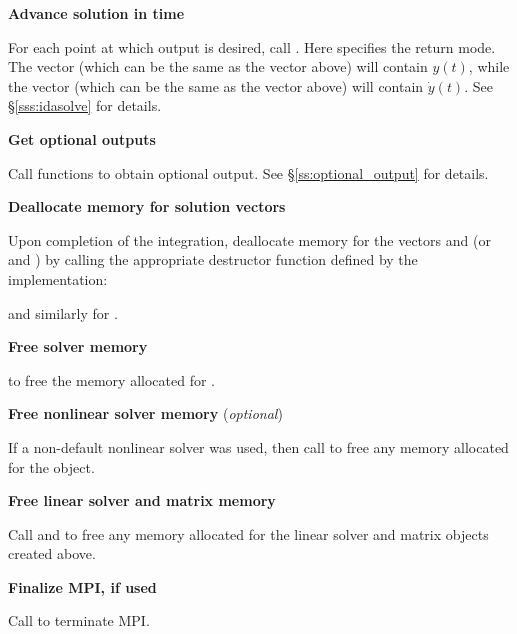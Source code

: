 \begin{Steps}
\item
  {\bf Advance solution in time}

  For each point at which output is desired, call
  .
  Here  specifies the return mode.  The vector 
  (which can be the same as the vector  above) will contain $y(t)$,
  while the vector  (which can be the same as the vector 
  above) will contain $\dot{y}(t)$.
  See \S\ref{sss:idasolve} for details.

\item
  {\bf Get optional outputs}

  Call  functions to obtain optional output.
  See \S\ref{ss:optional_output} for details.

\item
  {\bf Deallocate memory for solution vectors}

  Upon completion of the integration, deallocate memory for the vectors 
  and  (or  and ) by calling the appropriate destructor
  function defined by the {\nvector} implementation:


  and similarly for .

\item
  {\bf Free solver memory}

   to free the memory allocated for {\ida}.

\item
  {\bf Free nonlinear solver memory} (\textit{optional})

  If a non-default nonlinear solver was used, then call
   to free any memory allocated for the
  {\sunnonlinsol} object.

\item
  {\bf Free linear solver and matrix memory}

  Call  and  to free any memory
  allocated for the linear solver and matrix objects created above.

\item
  {\bf Finalize MPI, if used}

  Call  to terminate MPI.

\end{Steps}




